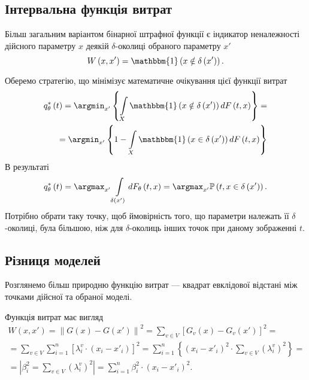 \subsection{Інтервальна функція витрат}

Більш загальним варіантом бінарної штрафної функції є
індикатор неналежності дійсного параметру $x$
деякій $\delta$-околиці обраного параметру $x'$
\begin{equation*}
  W \left( x, x' \right)
  = \mathbbm{1} \left( x \notin \delta\left( x' \right) \right).
\end{equation*}

Оберемо стратегію, що мінімізує математичне очікування цієї функції витрат
\begin{equation*}
  \begin{split}
    q^*_{\theta}\left( t \right)
    = \argmin_{x'} \left\{
      \int\limits_{X}
        \mathbbm{1} \left( x \notin \delta\left( x' \right) \right)
        d F\left( t, x \right)
      \right\} = \\
    = \argmin_{x'} \left\{
      1 -
      \int\limits_{X}
        \mathbbm{1} \left( x \in \delta\left( x' \right) \right)
        d F\left( t, x \right)
      \right\}
  \end{split}
\end{equation*}
В результаті
\begin{equation*}
  q^*_{\theta}\left( t \right)
  = \argmax_{x'} \int\limits_{\delta\left( x' \right)}
    dF_{\theta}\left( t, x \right)
  = \argmax_{x'} \mathbb{P} \left( t, x \in \delta\left( x' \right) \right).
\end{equation*}
Потрібно обрати таку точку,
щоб ймовірність того,
що параметри належать її $\delta$-околиці,
була більшою,
ніж для $\delta$-околиць інших точок при даному зображенні $t$.

\subsection{Різниця моделей}

Розглянемо більш природню функцію витрат ---
квадрат евклідової відстані між точками дійсної та обраної моделі.

Функція витрат має вигляд
\begin{equation*}
  \begin{split}
    W \left( x, x' \right)
    = \left\| G\left( x \right) - G\left( x' \right) \right\|^2
    = \sum_{v \in V} \left[
        G_v\left( x \right) - G_v\left( x' \right)
      \right]^2 = \\
    = \sum_{v \in V} \sum_{i = 1}^n \left[
        \lambda_i^v \cdot \left( x_i - x'_i \right)
      \right]^2
    = \sum_{i = 1}^n \left\{ \left( x_i - x'_i \right)^2
      \cdot \sum_{v \in V} \left( \lambda_i^v \right)^2 \right\} = \\
    = \left| \beta_i^2 = \sum_{v \in V} \left( \lambda_i^v \right)^2 \right|
    = \sum_{i = 1}^n \beta_i^2 \cdot \left( x_i - x'_i \right)^2.
  \end{split}
\end{equation*}

